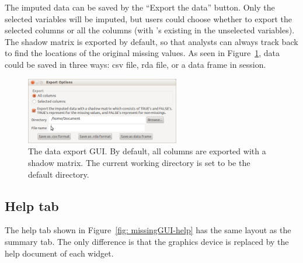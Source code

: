 \documentclass[article]{jss}
\begin{document}
The imputed data can be saved by the ``Export the data'' button. Only the selected variables will be imputed, but users could choose whether to export the selected columns or all the columns (with 's existing in the unselected variables). The shadow matrix is exported by default, so that analysts can always track back to find the locations of the original missing values. As seen in Figure~\ref{fig: export}, data could be saved in three ways: csv file, rda file, or a data frame in  session.

\begin{center}
\begin{figure}[h]
\begin{centering}
\includegraphics[width=0.6\textwidth]{fig7}
\par\end{centering}
\caption{The data export GUI. By default, all columns are exported with a shadow matrix. The current working directory is set to be the default directory.}
\label{fig: export}
\end{figure}
\par\end{center}


\subsection{Help tab}

The help tab shown in Figure~\ref{fig: missingGUI-help} has the same layout as the summary tab. The only difference is that the graphics device is replaced by the help document of each widget.
\end{document}
